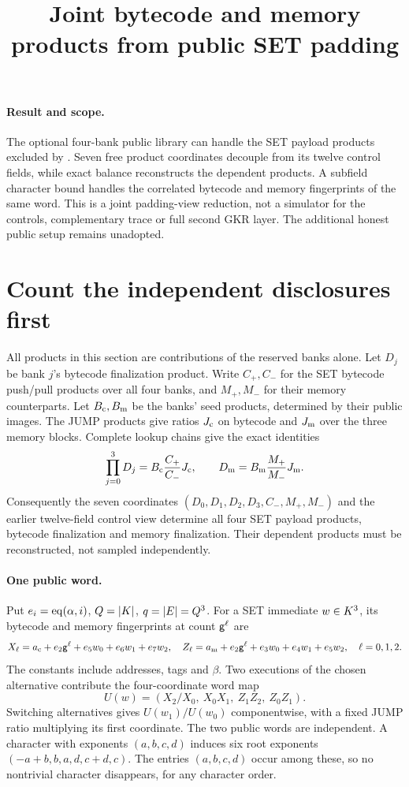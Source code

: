 \documentclass[11pt]{article}
\title{Joint bytecode and memory products from public SET padding}
\author{}
\date{}
\begin{document}
\maketitle
\vspace{-2em}

\paragraph{Result and scope.} The optional four-bank public library can handle the SET payload products excluded by . Seven free product coordinates decouple from its twelve control fields, while exact balance reconstructs the dependent products. A subfield character bound handles the correlated bytecode and memory fingerprints of the same word. This is a joint padding-view reduction, not a simulator for the controls, complementary trace or full second GKR layer. The additional honest public setup remains unadopted.

\section{Count the independent disclosures first}

All products in this section are contributions of the reserved banks alone. Let $D_j$ be bank $j$'s bytecode finalization product. Write $C_+,C_-$ for the SET bytecode push/pull products over all four banks, and $M_+,M_-$ for their memory counterparts. Let $B_{\rm c},B_{\rm m}$ be the banks' seed products, determined by their public images. The JUMP products give ratios $J_{\rm c}$ on bytecode and $J_{\rm m}$ over the three memory blocks. Complete lookup chains give the exact identities
\[
 \prod_{j=0}^3D_j=B_{\rm c}\frac{C_+}{C_-}J_{\rm c},
 \qquad D_{\rm m}=B_{\rm m}\frac{M_+}{M_-}J_{\rm m}.
\]
Consequently the seven coordinates $(D_0,D_1,D_2,D_3,C_-,M_+,M_-)$ and the earlier twelve-field control view determine all four SET payload products, bytecode finalization and memory finalization. Their dependent products must be reconstructed, not sampled independently.

\paragraph{One public word.} Put $e_i=\operatorname{eq}(\alpha,i)$, $Q=|K|$, $q=|E|=Q^3$. For a SET immediate $w\in K^3$, its bytecode and memory fingerprints at count $\mathsf{g}^\ell$ are
\[
 X_\ell=a_{\rm c}+e_2\mathsf{g}^\ell+e_5w_0+e_6w_1+e_7w_2,
 \quad
 Z_\ell=a_{\rm m}+e_2\mathsf{g}^\ell+e_3w_0+e_4w_1+e_5w_2,
 \quad \ell=0,1,2.
\]
The constants include addresses, tags and $\beta$. Two executions of the chosen alternative contribute the four-coordinate word map
\[
 U(w)=\left(X_2/X_0,\ X_0X_1,\ Z_1Z_2,\ Z_0Z_1\right).
\]
Switching alternatives gives $U(w_1)/U(w_0)$ componentwise, with a fixed JUMP ratio multiplying its first coordinate. The two public words are independent. A character with exponents $(a,b,c,d)$ induces six root exponents $(-a+b,b,a,d,c+d,c)$. The entries $(a,b,c,d)$ occur among these, so no nontrivial character disappears, for any character order.
\end{document}
